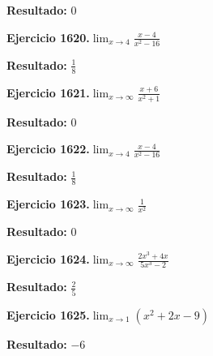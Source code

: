 \documentclass[10pt,a4paper]{article}
\begin{document}
\begin{solbox}
\textbf{Resultado:} \(\displaystyle 0\)
\end{solbox}

\begin{ejbox}
\textbf{Ejercicio 1620.}\quad $\lim_{x\to 4} \frac{x-4}{x^2-16}$
\end{ejbox}

\begin{solbox}
\textbf{Resultado:} \(\displaystyle \frac{1}{8}\)
\end{solbox}

\newpage
\begin{ejbox}
\textbf{Ejercicio 1621.}\quad $\lim_{x\to \infty} \frac{x + 6}{x^2 + 1}$
\end{ejbox}

\begin{solbox}
\textbf{Resultado:} \(\displaystyle 0\)
\end{solbox}

\begin{ejbox}
\textbf{Ejercicio 1622.}\quad $\lim_{x\to 4} \frac{x-4}{x^2-16}$
\end{ejbox}

\begin{solbox}
\textbf{Resultado:} \(\displaystyle \frac{1}{8}\)
\end{solbox}

\begin{ejbox}
\textbf{Ejercicio 1623.}\quad $\lim_{x\to \infty} \frac{1}{x^2}$
\end{ejbox}

\begin{solbox}
\textbf{Resultado:} \(\displaystyle 0\)
\end{solbox}

\newpage
\begin{ejbox}
\textbf{Ejercicio 1624.}\quad $\lim_{x\to \infty} \frac{2x^3 + 4x}{5x^3 - 2}$
\end{ejbox}

\begin{solbox}
\textbf{Resultado:} \(\displaystyle \frac{2}{5}\)
\end{solbox}

\begin{ejbox}
\textbf{Ejercicio 1625.}\quad $\lim_{x\to 1} (x^2 +2x -9)$
\end{ejbox}

\begin{solbox}
\textbf{Resultado:} \(\displaystyle -6\)
\end{solbox}
\end{document}
